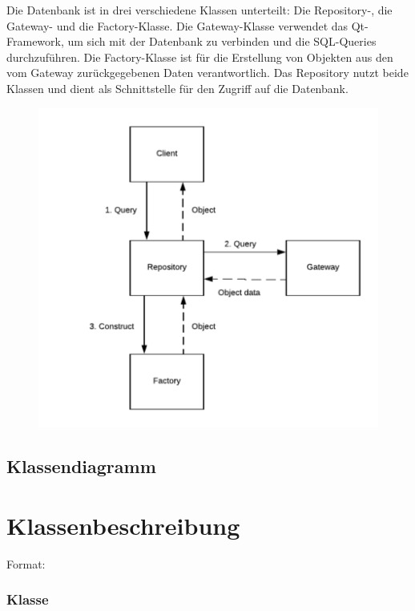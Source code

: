 \documentclass[a4paper,12pt]{article}
\begin{document}
\clearpage
Die Datenbank ist in drei verschiedene Klassen unterteilt: Die Repository-, die Gateway- und die Factory-Klasse. Die Gateway-Klasse verwendet das Qt-Framework, um sich mit der Datenbank zu verbinden und die SQL-Queries durchzuführen. Die Factory-Klasse ist für die Erstellung von Objekten aus den vom Gateway zurückgegebenen Daten verantwortlich. Das Repository nutzt beide Klassen und dient als Schnittstelle für den Zugriff auf die Datenbank.\newline


\begin{figure}
\includegraphics[width=\textwidth]{high_lvl_repository}
\end{figure}

\clearpage
\subsection{Klassendiagramm}





\clearpage
\section{Klassenbeschreibung}

\iffalse
Format:
\subsubsection{Klasse}
\end{document}
